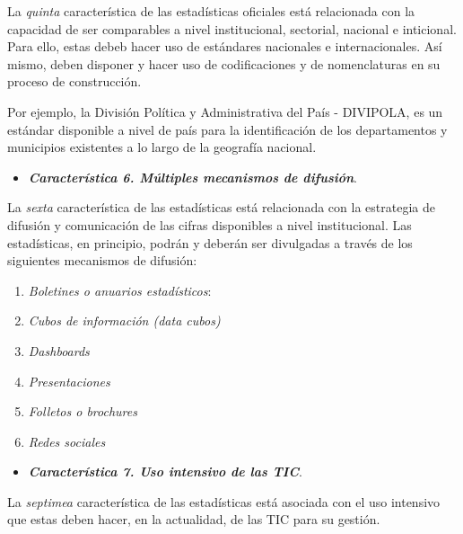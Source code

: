 \documentclass[
]{book}
\providecommand{\tightlist}{%
  \setlength{\itemsep}{0pt}\setlength{\parskip}{0pt}}
\begin{document}
La \emph{quinta} característica de las estadísticas oficiales está relacionada con la capacidad de ser comparables a nivel institucional, sectorial, nacional e inticional. Para ello, estas debeb hacer uso de estándares nacionales e internacionales. Así mismo, deben disponer y hacer uso de codificaciones y de nomenclaturas en su proceso de construcción.

Por ejemplo, la División Política y Administrativa del País - DIVIPOLA, es un estándar disponible a nivel de país para la identificación de los departamentos y municipios existentes a lo largo de la geografía nacional.

\begin{itemize}
\tightlist
\item
  \textbf{\emph{Característica 6. Múltiples mecanismos de difusión}}.
\end{itemize}

La \emph{sexta} característica de las estadísticas está relacionada con la estrategia de difusión y comunicación de las cifras disponibles a nivel institucional. Las estadísticas, en principio, podrán y deberán ser divulgadas a través de los siguientes mecanismos de difusión:

\begin{enumerate}
\def\labelenumi{\arabic{enumi}.}
\tightlist
\item
  \emph{Boletines o anuarios estadísticos}:
\item
  \emph{Cubos de información (data cubos)}
\item
  \emph{Dashboards}
\item
  \emph{Presentaciones}
\item
  \emph{Folletos o brochures}
\item
  \emph{Redes sociales}
\end{enumerate}

\begin{itemize}
\tightlist
\item
  \textbf{\emph{Característica 7. Uso intensivo de las TIC}}.
\end{itemize}

La \emph{septimea} característica de las estadísticas está asociada con el uso intensivo que estas deben hacer, en la actualidad, de las TIC para su gestión.
\end{document}
